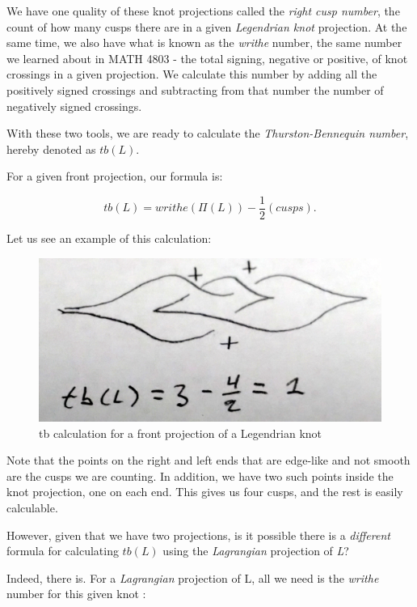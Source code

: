 \documentclass{article}
\begin{document}
We have one quality of these knot projections called the \textit{right cusp number},
the count of how many cusps there are in a given \textit{Legendrian knot} projection.
At the same time, we also have what is known as the \textit{writhe} number, the same
number we learned about in MATH 4803 - the total signing, negative or positive, of knot crossings
in a given projection. We calculate this number by adding all the positively signed crossings
and subtracting from that number the number of negatively signed crossings.

With these two tools, we are ready to calculate the \textit{Thurston-Bennequin number},
hereby denoted as $tb(L).$

For a given front projection, our formula \cite{etnyre} is:

\[tb(L) = writhe(\Pi(L)) - \frac{1}{2}(cusps).\]

Let us see an example of this calculation:

\begin{figure}[h!]
    \includegraphics[width=\linewidth]{tbFront.jpg}
    \caption{tb calculation for a front projection of a Legendrian knot}
    \label{fig:knot1}
\end{figure}

Note that the points on the right and left ends that are edge-like and not smooth are
the cusps we are counting. In addition, we have two such points inside the knot
projection, one on each end. This gives us four cusps, and the rest
is easily calculable.


However, given that we have two projections,
is it possible there is a \textit{different} formula for calculating $tb(L)$ using
the \textit{Lagrangian} projection of \textit{L}?

Indeed, there is. For a \textit{Lagrangian} projection of L, all we need is the
\textit{writhe} number for this given knot \cite{etnyre}:
\end{document}
